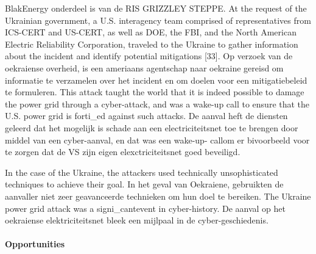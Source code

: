 {BlakEnergy onderdeel is van de RIS GRIZZLEY STEPPE.
At the request of the Ukrainian government, a U.S. interagency team comprised of
representatives from ICS-CERT and US-CERT, as well as DOE, the FBI, and the North
American Electric Reliability Corporation, traveled to the Ukraine to gather information about
the incident and identify potential mitigations [33]. Op verzoek van de oekraiense overheid, is
een ameriaans agentschap naar oekraine gereisd om informatie te verzamelen over het
incident en om doelen voor een mitigatiebeleid te formuleren.
This attack taught the world that it is indeed possible to damage the power grid through a
cyber-attack, and was a wake-up call to ensure that the U.S. power grid is forti_ed against
such attacks. De aanval heft de diensten geleerd dat het mogelijk is schade aan een
electriciteitsnet toe te brengen door middel van een cyber-aanval, en dat was een wake-up-
callom er bivoorbeeld voor te zorgen dat de VS zijn eigen elexctriciteitsnet goed beveiligd.

In the case of the Ukraine, the attackers used technically unsophisticated techniques to
achieve their goal. In het geval van Oekraiene, gebruikten de aanvaller niet zeer
geavanceerde technieken om hun doel te bereiken.
The Ukraine power grid attack was a signi_cantevent in cyber-history. De aanval op het
oekraiense elektriciteitsnet bleek een mijlpaal in de cyber-geschiedenis.

\paragraph{Opportunities}

}
